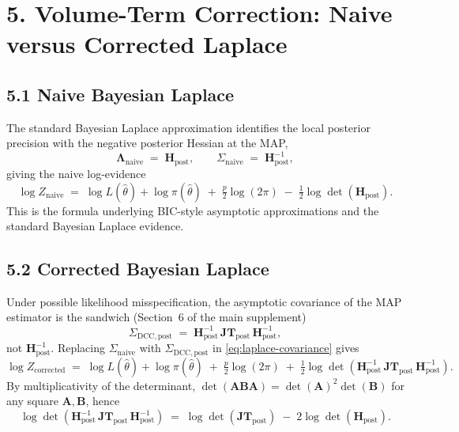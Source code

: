 \documentclass[11pt]{article}
\begin{document}
\section*{5. Volume-Term Correction: Naive versus Corrected Laplace}

\subsection*{5.1 Naive Bayesian Laplace}

The standard Bayesian Laplace approximation identifies the local posterior precision
with the negative posterior Hessian at the MAP,
\begin{equation}
\boldsymbol\Lambda_{\mathrm{naive}}
\;=\;
\mathbf H_{\mathrm{post}},
\qquad
\Sigma_{\mathrm{naive}}
\;=\;
\mathbf H_{\mathrm{post}}^{-1},
\label{eq:naive-curvature}
\end{equation}
giving the naive log-evidence
\begin{equation}
\log Z_{\mathrm{naive}}
\;=\;
\log L(\hat\theta) + \log\pi(\hat\theta)
\;+\;
\tfrac{p}{2}\log(2\pi)
\;-\;
\tfrac{1}{2}\log\det(\mathbf H_{\mathrm{post}}).
\label{eq:naive-Z}
\end{equation}
This is the formula underlying BIC-style asymptotic approximations and the standard
Bayesian Laplace evidence.

\subsection*{5.2 Corrected Bayesian Laplace}

Under possible likelihood misspecification, the asymptotic covariance of the MAP estimator
is the sandwich (Section~6 of the main supplement)
\begin{equation}
\Sigma_{\mathrm{DCC},\mathrm{post}}
\;=\;
\mathbf H_{\mathrm{post}}^{-1}\,
\mathbf{JT}_{\mathrm{post}}\,
\mathbf H_{\mathrm{post}}^{-1},
\label{eq:DCC-recall}
\end{equation}
not $\mathbf H_{\mathrm{post}}^{-1}$. Replacing $\Sigma_{\mathrm{naive}}$ with
$\Sigma_{\mathrm{DCC},\mathrm{post}}$ in \eqref{eq:laplace-covariance} gives
\begin{equation}
\log Z_{\mathrm{corrected}}
\;=\;
\log L(\hat\theta) + \log\pi(\hat\theta)
\;+\;
\tfrac{p}{2}\log(2\pi)
\;+\;
\tfrac{1}{2}\log\det\!\left(
\mathbf H_{\mathrm{post}}^{-1}\,
\mathbf{JT}_{\mathrm{post}}\,
\mathbf H_{\mathrm{post}}^{-1}
\right).
\label{eq:corrected-Z}
\end{equation}
By multiplicativity of the determinant, $\det(\mathbf A\mathbf B\mathbf A) = \det(\mathbf A)^2 \det(\mathbf B)$ for any square $\mathbf A, \mathbf B$, hence
\begin{equation}
\log\det\!\left(
\mathbf H_{\mathrm{post}}^{-1}\,
\mathbf{JT}_{\mathrm{post}}\,
\mathbf H_{\mathrm{post}}^{-1}
\right)
\;=\;
\log\det(\mathbf{JT}_{\mathrm{post}})
\;-\;
2\log\det(\mathbf H_{\mathrm{post}}).
\label{eq:logdet-expansion}
\end{equation}
\end{document}

